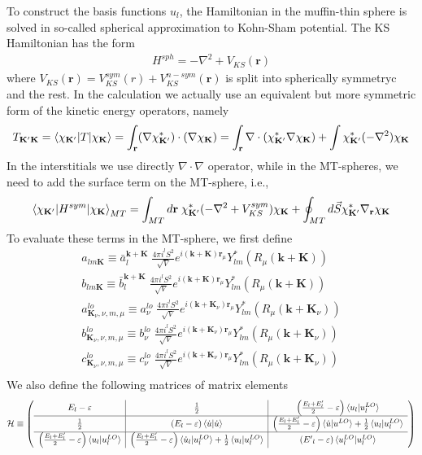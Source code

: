 \documentclass[aps,prb,floatfix,epsfig,singlecolumn,showpacs,preprintnumbers]{revtex4}
\renewcommand{\vr}{{\mathbf{r}}}
\newcommand{\vk}{{\mathbf{k}}}
\newcommand{\vK}{{\mathbf{K}}}
\newcommand{\cH}{{\cal H}}
\begin{document}
To construct the basis functions $u_l$, the Hamiltonian in the
muffin-thin sphere is solved in so-called spherical approximation to
Kohn-Sham potential. The KS Hamiltonian has the form
\begin{eqnarray}
H^{sph}=-\nabla^2 +V_{KS}(\vr)
\end{eqnarray}
where $V_{KS}(\vr)= V^{sym}_{KS}(r)+V_{KS}^{n-sym}(\vr)$ is split into  spherically symmetryc and the rest.
In the calculation we actually use an equivalent but more symmetric
form of the kinetic energy operators, namely
\begin{eqnarray}
T_{\vK'\vK} = \braket{\chi_{\vK'}|T|\chi_{\vK}} = \int_{\vr}  (\nabla\chi_{\vK'}^*)\cdot (\nabla\chi_{\vK})=
\int_{\vr} \nabla\cdot (\chi_{\vK'}^* \nabla\chi_{\vK} ) +\int \chi_{\vK'}^*(-\nabla^2)\chi_{\vK} 
\end{eqnarray}
In the interstitials we use directly $\nabla\cdot\nabla$ operator,
while in the MT-spheres, we need to add the surface term on the
MT-sphere, i.e.,
\begin{eqnarray}
\braket{\chi_{\vK'}|H^{sym}|\chi_\vK}_{MT}=\int_{MT}d\vr\; \chi^*_{\vK'}(-\nabla^2+V_{KS}^{sym})\chi_{\vK}+\oint_{MT} d\vec{S}\chi^*_{\vK'}\nabla_\vr\chi_{\vK}\\
\end{eqnarray}
To evaluate these terms in the MT-sphere, we first define
\begin{eqnarray}
a_{lm\vK} \equiv \bar{a}^{\vk+\vK}_{l}\;\frac{4\pi i^l S^2}{\sqrt{V}}e^{i(\vk+\vK)\vr_\mu}  Y^*_{lm}(R_\mu(\vk+\vK))\\
b_{lm\vK} \equiv \bar{b}^{\vk+\vK}_{l}\;\frac{4\pi i^l S^2}{\sqrt{V}}e^{i(\vk+\vK)\vr_\mu}  Y^*_{lm}(R_\mu(\vk+\vK))\\
a^{lo}_{\vK_\nu,\nu,m,\mu}\equiv a^{lo}_\nu\;\frac{4\pi i^l S^2}{\sqrt{V}}e^{i(\vk+\vK_\nu)\vr_\mu}  Y^*_{lm}(R_\mu(\vk+\vK_\nu))\\
b^{lo}_{\vK_\nu,\nu,m,\mu}\equiv b^{lo}_\nu\;\frac{4\pi i^l S^2}{\sqrt{V}}e^{i(\vk+\vK_\nu)\vr_\mu}  Y^*_{lm}(R_\mu(\vk+\vK_\nu))\\
c^{lo}_{\vK_\nu,\nu,m,\mu}\equiv c^{lo}_\nu\;\frac{4\pi i^l S^2}{\sqrt{V}}e^{i(\vk+\vK_\nu)\vr_\mu}  Y^*_{lm}(R_\mu(\vk+\vK_\nu))\\
\end{eqnarray}
We also define the following matrices of matrix elements
\begin{eqnarray}
\cH \equiv \left(
\begin{array}{c|c|c}
E_l-\varepsilon & \frac{1}{2} & \left(\frac{E_l+E'_l}{2}-\varepsilon\right) \braket{u_l|u_l^{LO}} \\
\hline
\frac{1}{2} & (E_l-\varepsilon) \braket{\dot{u}|\dot{u}} & \left(\frac{E_l+E'_l}{2}-\varepsilon\right) \braket{\dot{u}|u^{LO}} +\frac{1}{2}\braket{u_l|u_l^{LO}}\\
\hline
\left(\frac{E_l+E'_l}{2}-\varepsilon\right) \braket{u_l|u^{LO}_l}&\left(\frac{E_l+E'_l}{2}-\varepsilon\right) \braket{\dot{u}_l|u^{LO}_l}+\frac{1}{2}\braket{u_l|u_l^{LO}}& ({E'}_l-\varepsilon)\braket{u_l^{LO}|u_l^{LO}}
\end{array}
\right)
\end{eqnarray}
\end{document}
